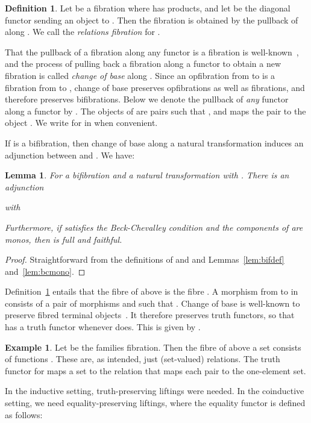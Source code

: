 \documentclass{LMCS}
\theoremstyle{plain}
\newtheorem{lemma}[theorem]{Lemma}
\theoremstyle{remark}
\theoremstyle{definition}
\newtheorem{definition}[theorem]{Definition}
\newtheorem{example}[theorem]{Example}
\begin{document}
\begin{definition}\label{def:cob}
  Let  be a fibration where  has products, and let
   be the diagonal functor sending an object  to
  . Then the fibration  is obtained
  by the pullback of  along . We call  the {\em
    relations fibration} for .
\end{definition}

That the pullback of a fibration along any functor is a fibration is
well-known~\cite{jac94}, and the process of pulling back a fibration
along a functor  to obtain a new fibration is called {\em change of
  base} along . Since an opfibration from  to  is a
fibration from  to , change of base preserves
opfibrations as well as fibrations, and therefore preserves
bifibrations. Below we denote the pullback of {\em any} functor  along a functor  by . The
objects of  are pairs  such that , and 
maps the pair  to the object .  We write  for  in
 when convenient.

If  is a bifibration, then change of base along a
natural transformation  induces an adjunction
between  and . We have:

\begin{lemma}\label{lem:natadj}
  For  a bifibration and  a natural
  transformation with . There is an adjunction
  
  with
  
Furthermore, if  satisfies the Beck-Chevalley condition 
and the components of  are monos, then  is full
and faithful.
\end{lemma}
\begin{proof}
  Straightforward from the definitions of  and
   and Lemmas~\ref{lem:bifdef} and~\ref{lem:bcmono}.
\end{proof}

Definition~\ref{def:cob} entails that the fibre of  above 
is the fibre . A morphism from  to 
in  consists of a pair of morphisms  and
 such that . Change
of base is well-known to preserve fibred terminal
objects~\cite{her93b}. It therefore preserves truth functors, so that
 has a truth functor whenever  does. This is given by
.

\begin{example}
Let  be the families fibration. Then the fibre of  above a
set  consists of functions . These are, as
intended, just (set-valued) relations. The truth functor for 
maps a set  to the relation  that maps
each pair  to the one-element set.
\end{example}

In the inductive setting, truth-preserving liftings were needed. In
the coinductive setting, we need equality-preserving liftings, where
the equality functor is defined as follows:
\end{document}
